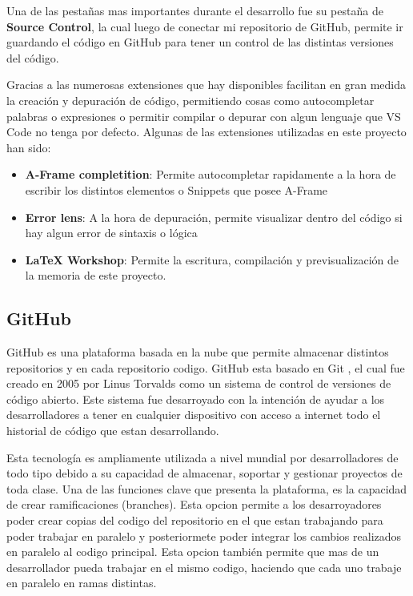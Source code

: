 \documentclass[a4paper, 12pt]{book}
\begin{document}
Una de las pestañas mas importantes durante el desarrollo fue su pestaña de \textbf{Source Control}, la cual luego de conectar mi repositorio de GitHub, permite ir guardando el código en GitHub para tener un control de las distintas versiones del código. 

Gracias a las numerosas extensiones que hay disponibles facilitan en gran medida la creación y depuración de código, permitiendo cosas como autocompletar palabras o expresiones o permitir compilar o depurar con algun lenguaje que VS Code no tenga por defecto.
Algunas de las extensiones utilizadas en este proyecto han sido: 
\begin{itemize}
  \item \textbf{A-Frame completition}: Permite autocompletar rapidamente a la hora de escribir los distintos elementos o Snippets que posee A-Frame
  \item \textbf{Error lens}: A la hora de depuración, permite visualizar dentro del código si hay algun error de sintaxis o lógica 
  \item \textbf{LaTeX Workshop}: Permite la escritura, compilación y previsualización de la memoria de este proyecto.
\end{itemize}

\subsection{GitHub}
\label{subsect:github}

GitHub es una plataforma basada en la nube que permite almacenar distintos repositorios y en cada repositorio codigo. GitHub esta basado en Git \cite{git}, el cual fue creado en 2005 por Linus Torvalds como un sistema de control de versiones de código abierto.
Este sistema fue desarroyado con la intención de ayudar a los desarrolladores a tener en cualquier dispositivo con acceso a internet todo el historial de código que estan desarrollando. 

Esta tecnología es ampliamente utilizada a nivel mundial por desarrolladores de todo tipo debido a su capacidad de almacenar, soportar y gestionar proyectos de toda clase. Una de las funciones clave que presenta la plataforma, es la capacidad de crear ramificaciones (branches). Esta opcion permite a los desarroyadores poder crear copias del codigo del repositorio en el que 
estan trabajando para poder trabajar en paralelo y posteriormete poder integrar los cambios realizados en paralelo al codigo principal. Esta opcion también permite que mas de un desarrollador pueda trabajar en el mismo codigo, haciendo que cada uno trabaje en paralelo en ramas distintas. 
\end{document}
